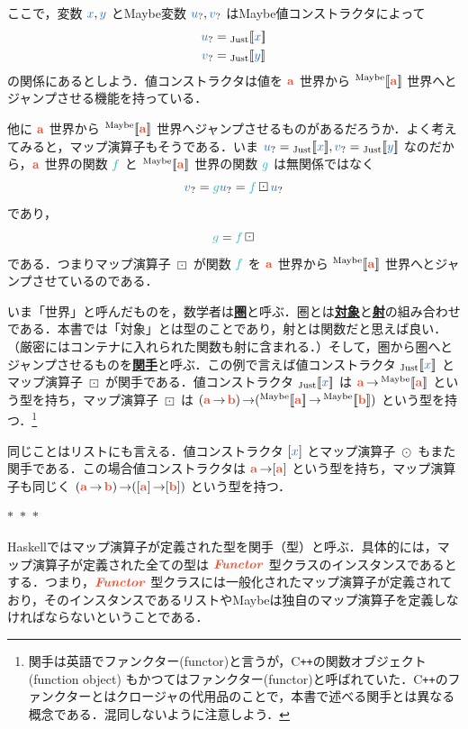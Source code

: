 \documentclass[a5paper,twoside,fleqn,draft]{jsbook}
\def\[{[\![}
\def\]{]\!]}
\def\varColor{NavyBlue}
\def\funcColor{BlueGreen}
\def\typeColor{RedOrange}
\newcommand{\separator}{\begin{center}$*$~$*$~$*$\end{center}}
\newcommand{\programminglanguage}[1]{\textsf{#1}}
\newcommand{\cxx}{\programminglanguage{C}\texttt{++}}
\newcommand{\haskell}{\programminglanguage{Haskell}}
\newcommand{\keyword}[1]{{\underline{\textbf{#1}}}}
\newcommand{\mVar}[1]{\textcolor{\varColor}{#1}}
\newcommand{\mXVar}{\mVar{x}}
\newcommand{\mYVar}{\mVar{y}}
\newcommand{\mFunc}[1]{\textcolor{\funcColor}{#1}}
\newcommand{\mFFunc}{{\mFunc{f}}}
\newcommand{\mGFunc}{\mFunc{g}}
\DeclareMathOperator{\mFuncArrow}{\rightarrow}
\DeclareMathOperator{\mMapList}{\odot}
\DeclareMathOperator{\mMapMaybe}{\boxdot}
\newcommand{\mType}[1]{\textcolor{\typeColor}{\mathbf{#1}}}
\newcommand{\mA}{\mType{a}}
\newcommand{\mB}{\mType{b}}
\newcommand{\mTypeAssemble}[2]{{}^\mathrm{#1}\[\mType{#2}\]}
\newcommand{\mMaybeType}[1]{\mTypeAssemble{Maybe}{#1}}
\newcommand{\mValueConstructor}[1]{\mathrm{#1}}
\newcommand{\mValueWith}[2]{{}_\mValueConstructor{#1}\[\mVar{#2}\]}
\newcommand{\mJustWith}[1]{\mValueWith{Just}{#1}}
\newcommand{\mTypeClass}[1]{\textcolor{\typeColor}{\textbf{\textit{#1}}}}
\newcommand{\mFunctorTypeClass}{\mTypeClass{Functor}}
\newcommand{\mMaybe}[1]{\mVar{#1}_?}
\begin{document}
ここで，変数 $\mXVar,\mYVar$ とMaybe変数 $\mMaybe{u},\mMaybe{v}$ はMaybe値コンストラクタによって
\begin{align}
  \mMaybe{u}
  &=\mJustWith{x}\\
  \mMaybe{v}
  &=\mJustWith{y}
\end{align}
の関係にあるとしよう．値コンストラクタは値を $\mA$ 世界から $\mMaybeType{a}$ 世界へとジャンプさせる機能を持っている．

他に $\mA$ 世界から $\mMaybeType{a}$ 世界へジャンプさせるものがあるだろうか．よく考えてみると，マップ演算子もそうである．いま $\mMaybe{u}=\mJustWith{x},\mMaybe{v}=\mJustWith{y}$ なのだから，$\mA $ 世界の関数 $\mFFunc$ と $\mMaybeType{a}$ 世界の関数 $\mGFunc$ は無関係ではなく
\begin{equation}
  \mMaybe{v}
  =\mGFunc\mMaybe{u}
  =\mFFunc\mMapMaybe\mMaybe{u}
\end{equation}
であり，
\begin{equation}
  \mGFunc
  =\mFFunc\mMapMaybe
\end{equation}
である．つまりマップ演算子 $\mMapMaybe$ が関数 $\mFFunc$ を $\mA$ 世界から $\mMaybeType{a}$ 世界へとジャンプさせているのである．

いま「世界」と呼んだものを，数学者は\keyword{圏}と呼ぶ．圏とは\keyword{対象}と\keyword{射}の組み合わせである．本書では「対象」とは型のことであり，射とは関数だと思えば良い．（厳密にはコンテナに入れられた関数も射に含まれる．）そして，圏から圏へとジャンプさせるものを\keyword{関手}と呼ぶ．この例で言えば値コンストラクタ $\mJustWith{x}$ とマップ演算子 $\mMapMaybe$ が関手である．値コンストラクタ $\mJustWith{x}$ は $\mA\mFuncArrow\mMaybeType{a}$ という型を持ち，マップ演算子 $\mMapMaybe$ は $(\mA\mFuncArrow\mB)\mFuncArrow(\mMaybeType{a}\mFuncArrow\mMaybeType{b})$ という型を持つ．\footnote{関手は英語でファンクター(functor)と言うが，\cxx の関数オブジェクト (function object) もかつてはファンクター(functor)と呼ばれていた．\cxx のファンクターとはクロージャの代用品のことで，本書で述べる関手とは異なる概念である．混同しないように注意しよう．}

同じことはリストにも言える．値コンストラクタ $[\mXVar]$ とマップ演算子 $\mMapList$ もまた関手である．この場合値コンストラクタは $\mA\mFuncArrow[\mA]$ という型を持ち，マップ演算子も同じく $(\mA\mFuncArrow\mB)\mFuncArrow([\mA]\mFuncArrow[\mB])$ という型を持つ．

\separator

\haskell ではマップ演算子が定義された型を関手（型）と呼ぶ．具体的には，マップ演算子が定義された全ての型は $\mFunctorTypeClass$ 型クラスのインスタンスであるとする．つまり，$\mFunctorTypeClass$ 型クラスには一般化されたマップ演算子が定義されており，そのインスタンスであるリストやMaybeは独自のマップ演算子を定義しなければならないということである．
\end{document}
